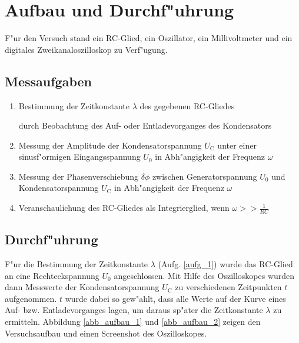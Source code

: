 \documentclass{scrartcl}
\begin{document}
	\section{Aufbau und Durchf"uhrung}

		F"ur den Versuch stand ein RC-Glied, ein Oszillator, ein Millivoltmeter und ein digitales Zweikanaloszilloskop zu Verf"ugung.


		\subsection{Messaufgaben}

			\begin{enumerate}
				\item \label{aufg_1} Bestimmung der Zeitkonstante $\lambda$ des gegebenen RC-Gliedes

				durch Beobachtung des Auf- oder Entladevorganges des Kondensators
				\item \label{aufg_2} Messung der Amplitude der Kondensatorspannung $U_{\mathrm{C}}$ unter einer sinusf"ormigen Eingangsspannung $U_0$ in Abh"angigkeit der Frequenz $\omega$

				\item \label{aufg_3} Messung der Phasenverschiebung $\delta \phi$ zwischen Generatorspannung $U_0$ und Kon\-den\-sator\-spannung $U_{\mathrm{C}}$ in Abh"angigkeit der Frequenz $\omega$

				\item \label{aufg_4} Veranschaulichung des RC-Gliedes als Integrierglied, wenn $\omega >> \frac{1}{RC}$

			\end{enumerate}

		\subsection{Durchf"uhrung}

			F"ur die Bestimmung der Zeitkonstante $\lambda$ (Aufg. \ref{aufg_1}) wurde das RC-Glied an eine Rechteck\-spannung $U_0$ angeschlossen.
			Mit Hilfe des Oszilloskopes wurden dann Messwerte der Kondensatorspannung $U_{\mathrm{C}}$ zu verschiedenen Zeitpunkten $t$ aufgenommen.
			$t$ wurde dabei so gew"ahlt, dass alle Werte auf der Kurve eines Auf- bzw. Entladevorganges lagen,
			um daraus sp"ater die Zeitkonstante $\lambda$ zu ermitteln.
			Abbildung \ref{abb_aufbau_1} und \ref{abb_aufbau_2} zeigen den Versuchsaufbau und einen Screenshot des Oszilloskopes.\\
\end{document}
